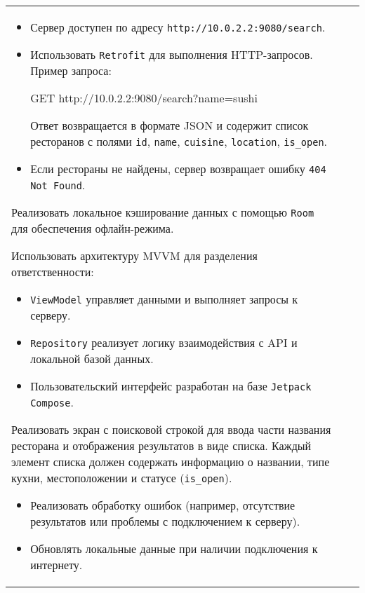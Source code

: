 \documentclass[a4paper]{article}
\begin{document}
\begin{tabular}{!{\vrule width 2pt}p{5cm}|p{6cm}|p{4cm}!{\vrule width 2pt}}
{\begin{minipage}{16cm}
\begin{enumerate}
\begin{itemize}
    \item Сервер доступен по адресу \texttt{http://10.0.2.2:9080/search}.
    \item Использовать \texttt{Retrofit} для выполнения HTTP-запросов. Пример запроса:

GET http://10.0.2.2:9080/search?name=sushi

Ответ возвращается в формате JSON и содержит список ресторанов с полями \texttt{id}, 
\texttt{name}, \texttt{cuisine}, \texttt{location}, \texttt{is\_open}.
    \item Если рестораны не найдены, сервер возвращает ошибку \texttt{404 Not Found}.
\end{itemize}

Реализовать локальное кэширование данных с помощью \texttt{Room} для обеспечения офлайн-режима.

Использовать архитектуру MVVM для разделения ответственности:
\begin{itemize}
    \item \texttt{ViewModel} управляет данными и выполняет запросы к серверу.
    \item \texttt{Repository} реализует логику взаимодействия с API и локальной базой данных.
    \item Пользовательский интерфейс разработан на базе \texttt{Jetpack Compose}.
\end{itemize}

Реализовать экран с поисковой строкой для ввода части названия ресторана и отображения результатов в виде списка. Каждый элемент списка должен содержать информацию о названии, типе кухни, местоположении и статусе (\texttt{is\_open}).

\begin{itemize}
    \item Реализовать обработку ошибок (например, отсутствие результатов или проблемы с подключением к серверу).
    \item Обновлять локальные данные при наличии подключения к интернету.
\end{itemize} 
\end{enumerate}


\end{minipage}}
\end{tabular}
\end{document}
